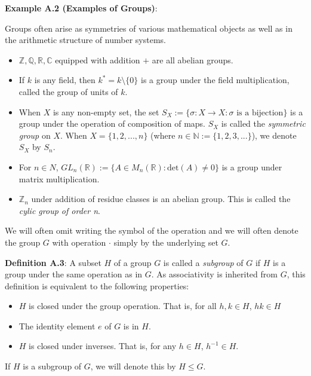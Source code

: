 \documentclass[12pt]{article}
\newcommand{\vs}{\vskip10pt}
\begin{document}
	\textbf{Example A.2 (Examples of Groups)}: 
	
	Groups often arise as symmetries of various mathematical objects as well as in the arithmetic structure of number systems.
	
	\begin{itemize}
		\item $\mathbb{Z}, \mathbb{Q}, \mathbb{R}, \mathbb{C}$ equipped with addition $+$ are all abelian groups. 
		\item If $k$ is any field, then $k^{*} = k \setminus \{0\}$ is a group under the field multiplication, called the group of units of $k$.
		\item When $X$ is any non-empty set, the set $S_X := \{\sigma: X \rightarrow X  : \sigma \text{ is a bijection}\}$ is a group under the operation of composition of maps. $S_X$ is called the \textit{symmetric group} on $X$. When $X = \{1,2,...,n\}$ (where $n \in \mathbb{N} := \{1,2,3,...\}$), we denote $S_X$ by $S_n$.
		\item For $n \in N$, $GL_n(\mathbb{R}) := \{A \in M_n(\mathbb{R})  : \text{det}(A) \neq 0\}$ is a group under matrix multiplication. 
		\item $\mathbb{Z}_n$ under addition of residue classes is an abelian group. This is called the \textit{cylic group of order n}. 
	\end{itemize}
	
	\vs
	
	We will often omit writing the symbol of the operation and we will often denote the group $G$ with operation $\cdot$ simply by the underlying set $G$.
	
	\vs
	
	\textbf{Definition A.3}: A subset $H$ of a group $G$ is called a \textit{subgroup} of $G$ if $H$ is a group under the same operation as in $G$. As associativity is inherited from $G$, this definition is equivalent to the following properties: 
	
	\begin{itemize}
		\item $H$ is closed under the group operation. That is, for all $h,k \in H$, $hk \in H$
		\item The identity element $e$ of $G$ is in $H$.
		\item $H$ is closed under inverses. That is, for any $h \in H$, $h^{-1} \in H$. 
	\end{itemize}
	
	\vs 
	
	If $H$ is a subgroup of $G$, we will denote this by $H \leq G$.
	
\end{document}
